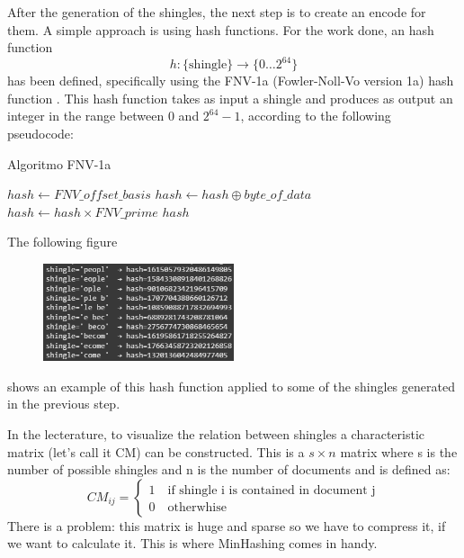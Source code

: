 \documentclass[12pt, a4paper]{article}
\begin{document}
After the generation of the shingles, the next step is to create an encode for them. A simple approach is using hash functions. For the work done, an hash function 
\begin{equation}
    h: \{ \text{shingle}\} \to \{ 0\ldots2^{64} \}
\end{equation}
has been defined, specifically using the FNV-1a (Fowler-Noll-Vo version 1a) hash function \cite{wikipedia-fnv}. This hash function takes as input a shingle and produces as output an integer in the range between 0 and $2^{64}-1$, according to the following pseudocode:
\begin{center}
\begin{algorithm}[H]
\caption{Algoritmo FNV-1a}
\begin{algorithmic}[1]
\State $hash \gets FNV\_offset\_basis$
    \State $hash \gets hash \oplus byte\_of\_data$
    \State $hash \gets hash \times FNV\_prime$
\EndFor
\State \Return $hash$
\end{algorithmic}
\end{algorithm}
\end{center}

The following figure
\begin{figure}[H]
    \centering
    \includegraphics[width=0.5\textwidth]{Screenshot 2025-09-04 104157.png}
    \label{fig:placeholder}
\end{figure}
shows an example of this hash function applied to some of the shingles generated in the previous step.

In the lecterature, to visualize the relation between shingles a characteristic matrix (let's call it CM) can be constructed. This is a $s \times n$ matrix where s is the number of possible shingles and n is the number of documents and is defined as:
\begin{equation}
    CM_{ij} = 
    \begin{cases}
    1 \ \ \  \text{ if shingle i is contained in document j} \\ 
    0 \ \ \ \text{ otherwhise}
    \end{cases}
\end{equation}
There is a problem: this matrix is huge and sparse so we have to compress it, if we want to calculate it. This is where MinHashing comes in handy. 
\end{document}
